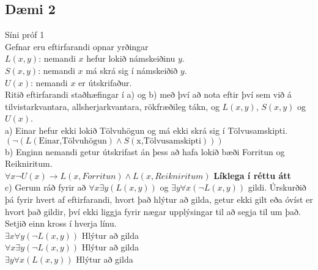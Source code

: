 \subsection*{Dæmi 2}
Síni próf 1\\
Gefnar eru eftirfarandi opnar yrðingar\\
$L(x,y)$: nemandi $x$ hefur lokið námskeiðinu $y$.\\
$S(x,y)$: nemandi $x$ má skrá sig í námskeiðið $y$.\\
$U(x)$: nemandi $x$ er útskrifaður.\\
Ritið eftirfarandi staðhæfingar í a) og b) með því að nota eftir því sem við á tilvistarkvantara, allsherjarkvantara, rökfræðileg tákn, og $L(x,y)$, $S(x,y)$ og $U(x)$.\\
a) Einar hefur ekki lokið Tölvuhögun og má ekki skrá sig í Tölvusamskipti.\\
\indent \indent $(\lnot (L(\text{Einar,Tölvuhögun}) \wedge S(\text{x,Tölvusamskipti})))$ \\
b) Enginn nemandi getur útskrifast án þess að hafa lokið bæði Forritun og Reikniritum.\\
\indent \indent $\forall x \lnot U(x) \to L(x, Forritun) \wedge L(x, Reikniritum)$ \textbf{Líklega í réttu átt}\\
c) Gerum ráð fyrir að $\forall x \exists y(L(x,y))$ og $\exists y \forall x (\lnot L(x,y))$ gildi. Úrskurðið þá fyrir hvert af eftirfarandi, hvort það hlýtur að gilda, getur ekki gilt eða óvíst er hvort það gildir, því ekki liggja fyrir nægar upplýsingar til að segja til um það. Setjið einn kross í hverja línu.\\
\indent \indent $\exists x \forall y(\lnot L(x,y))$ Hlýtur að gilda\\
\indent \indent $\forall x \exists y(\lnot L(x,y))$ Hlýtur að gilda\\    
\indent \indent $\exists y \forall x(L(x,y))$ Hlýtur að gilda
\newpage